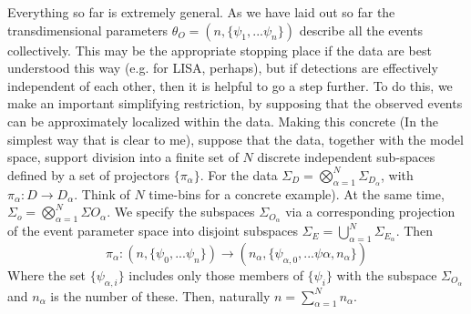 \documentclass[twocolumn,showpacs,aps,prd,nobibnotes,nofootinbib,floatfix]{revtex4-1}
\begin{document}
Everything so far is extremely general.  As we have laid out so far the transdimensional parameters $\theta_O=(n,\{\psi_1,...\psi_n\})$ describe all the events collectively.  This may be the appropriate stopping place if the data are best understood this way (e.g. for LISA, perhaps), but if detections are effectively independent of each other, then it is helpful to go a step further. To do this, we make an important simplifying restriction, by supposing that the observed events can be approximately localized within the data.  Making this concrete (In the simplest way that is clear to me), suppose that the data, together with the model space, support division into a finite set of $N$ discrete independent sub-spaces defined by a set of projectors $\{\pi_\alpha\}$. For the data $\Sigma_D=\bigotimes_{\alpha=1}^N\Sigma_{D_\alpha}$, with $\pi_\alpha:D\rightarrow D_\alpha$.  Think of $N$ time-bins for a concrete example). At the same time, $\Sigma_o=\bigotimes_{\alpha=1}^N\Sigma{O_\alpha}$.  We specify the subspaces $\Sigma_{O_\alpha}$ via a corresponding projection of the event parameter space into disjoint subspaces $\Sigma_E=\bigcup_{\alpha=1}^N\Sigma_{E_\alpha}$. Then  
\begin{equation*}
  \pi_{\alpha}:(n,\{\psi_0,...\psi_n\})\rightarrow(n_\alpha,\{\psi_{\alpha,0},...\psi{\alpha,n_\alpha}\})
\end{equation*}
Where the set $\{\psi_{\alpha,i}\}$ includes only those members of $\{\psi_i\}$ with the subspace $\Sigma_{O_\alpha}$ and $n_\alpha$ is the number of these. Then, naturally $n=\sum_{\alpha=1}^Nn_\alpha$.
\end{document}

